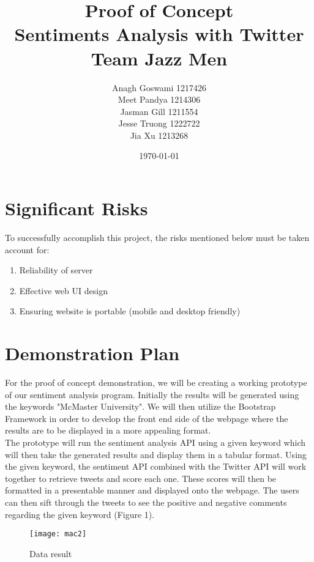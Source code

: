 \documentclass[12pt]{article}
\begin{document}
\title{Proof of Concept\\ Sentiments Analysis with Twitter \\Team Jazz Men}
\author{Anagh Goswami 1217426 \\ Meet Pandya 1214306 \\ Jasman Gill  1211554 \\ Jesse Truong  1222722 \\ Jia Xu  1213268 \\}
\date{\today}
\maketitle
\newpage

\section{Significant Risks}
To successfully accomplish this project, the risks mentioned below must be taken account for:
\begin{enumerate}
	\item Reliability of server
	\item Effective web UI design
	\item Ensuring website is portable (mobile and desktop friendly)
	
\end{enumerate}



\section{Demonstration Plan}
For the proof of concept demonstration, we will be creating a working prototype of our sentiment analysis program. Initially the results will be generated using the keywords "McMaster University". We will then utilize the Bootstrap Framework in order to develop the front end side of the webpage where the results are to be displayed in a more appealing format. \\

The prototype will run the sentiment analysis API using a given keyword which will then take the generated results and display them in a tabular format. Using the given keyword, the sentiment API combined with the Twitter API will work together to retrieve tweets and score each one. These scores will then be formatted in a presentable manner and displayed onto the webpage. The users can then sift through the tweets to see the positive and negative comments regarding the given keyword (Figure 1). 

\begin{figure}[!htb]
\centering
\texttt{[image: mac2]}
\caption{Data result}
\label{fig:Data}
\end{figure}
\end{document}
